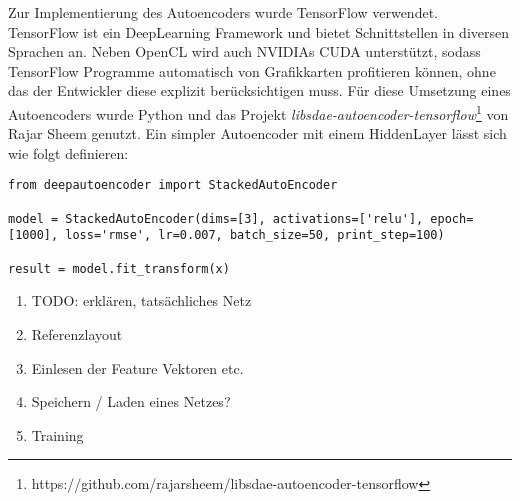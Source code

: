 Zur Implementierung des Autoencoders wurde TensorFlow verwendet. TensorFlow ist ein DeepLearning Framework und bietet Schnittstellen in diversen Sprachen an. Neben OpenCL wird auch NVIDIAs CUDA unterstützt, sodass TensorFlow Programme automatisch von Grafikkarten profitieren können, ohne das der Entwickler diese explizit berücksichtigen muss. Für diese Umsetzung eines Autoencoders wurde Python und das Projekt \textit{libsdae-autoencoder-tensorflow}\footnote{https://github.com/rajarsheem/libsdae-autoencoder-tensorflow} von Rajar Sheem genutzt. Ein simpler Autoencoder mit einem HiddenLayer lässt sich wie folgt definieren:

\lstset{language=Python}
\begin{lstlisting}
from deepautoencoder import StackedAutoEncoder

model = StackedAutoEncoder(dims=[3], activations=['relu'], epoch=[1000], loss='rmse', lr=0.007, batch_size=50, print_step=100)
                       
result = model.fit_transform(x)
\end{lstlisting}

\begin{enumerate}
	\item TODO: erklären, tatsächliches Netz
	\item Referenzlayout
	\item Einlesen der Feature Vektoren etc.
	\item Speichern / Laden eines Netzes?
	\item Training
\end{enumerate}